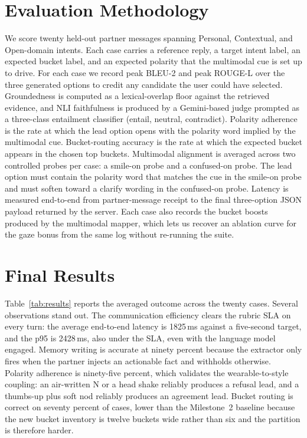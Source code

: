 \documentclass[10pt,letterpaper]{article}
\begin{document}
\section{Evaluation Methodology}
We score twenty held-out partner messages spanning Personal,
Contextual, and Open-domain intents. Each case carries a reference
reply, a target intent label, an expected bucket label, and an
expected polarity that the multimodal cue is set up to drive. For
each case we record peak BLEU-2 and peak ROUGE-L over the three
generated options to credit any candidate the user could have
selected. Groundedness is computed as a lexical-overlap floor against
the retrieved evidence, and NLI faithfulness is produced by a
Gemini-based judge prompted as a three-class entailment classifier
(entail, neutral, contradict). Polarity adherence is the rate at
which the lead option opens with the polarity word implied by the
multimodal cue. Bucket-routing accuracy is the rate at which the
expected bucket appears in the chosen top buckets. Multimodal
alignment is averaged across two controlled probes per case: a
smile-on probe and a confused-on probe. The lead option must contain
the polarity word that matches the cue in the smile-on probe and must
soften toward a clarify wording in the confused-on probe. Latency is
measured end-to-end from partner-message receipt to the final
three-option JSON payload returned by the server. Each case also
records the bucket boosts produced by the multimodal mapper, which
lets us recover an ablation curve for the gaze bonus from the same
log without re-running the suite.

\section{Final Results}
Table~\ref{tab:results} reports the averaged outcome across the
twenty cases. Several observations stand out. The communication
efficiency clears the rubric SLA on every turn: the average
end-to-end latency is 1825\,ms against a five-second target, and the
p95 is 2428\,ms, also under the SLA, even with the language model
engaged. Memory writing is accurate at ninety percent because the
extractor only fires when the partner injects an actionable fact and
withholds otherwise. Polarity adherence is ninety-five percent,
which validates the wearable-to-style coupling: an air-written N or
a head shake reliably produces a refusal lead, and a thumbs-up plus
soft nod reliably produces an agreement lead. Bucket routing is
correct on seventy percent of cases, lower than the
Milestone~2 baseline because the new bucket inventory is twelve
buckets wide rather than six and the partition is therefore harder.
\end{document}
